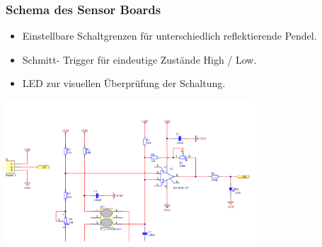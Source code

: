 \begin{frame}
	\frametitle{Schema des Sensor Boards}
	\begin{itemize}
		\item Einstellbare Schaltgrenzen für unterschiedlich reflektierende Pendel.
		\item Schmitt- Trigger für eindeutige Zustände High / Low.
		\item LED zur visuellen Überprüfung der Schaltung.
	\end{itemize}
	\centering
	\includegraphics[width=0.7\textwidth]{../docs/images/Circuit_Sensor}
\end{frame}

